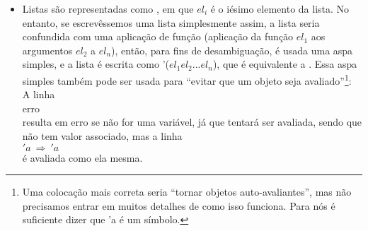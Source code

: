 \begin{itemize}
\item Listas são representadas como , em que $el_i$ é o iésimo elemento da lista. No entanto, se
  escrevêssemos uma lista simplesmente assim, a lista seria
  confundida com uma aplicação de função (aplicação da função $el_1$
  aos argumentos $el_2$ a $el_n$), então, para fins de
  desambiguação, é usada uma aspa simples, e a lista é escrita como
  '($el_1 el_2 ... el_n$), que é equivalente a  . Essa aspa simples também pode ser usada para
  ``evitar que um objeto seja avaliado''\footnote{Uma colocação mais
    correta seria ``tornar objetos auto-avaliantes'', mas não
    precisamos entrar em muitos detalhes de como isso funciona. Para
    nós é suficiente dizer que 'a é um símbolo.}:\\
  A linha\\
   \seta erro\\
  resulta em erro se  não for uma variável, já que
  tentará ser avaliada, sendo que  não tem valor
  associado, mas a linha\\
  $'a\ \Rightarrow\ 'a$\\
  é avaliada como ela mesma.\\


\end{itemize}
